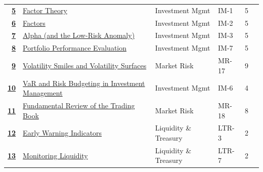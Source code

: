 \begin{longtable}{@{}r@{\hskip 7pt}L{6.35cm}@{\hskip 5pt}l@{\hskip 10pt}l@{\hskip 3pt}r@{\hskip 7pt}r@{}}
\hyperref[roi:5]{{\sffamily\bfseries\color{FRMGold}5}} & \hyperref[roi:5]{{\color{black}Factor Theory}} & {\color{FRMGrey}Investment Mgmt} & {\color{FRMGrey}IM-1} & {\color{FRMGrey}5} & \hyperref[roi:5]{{\sffamily\bfseries\color{FRMNavy}\pageref{roi:5}}} \\
\hyperref[roi:6]{{\sffamily\bfseries\color{FRMGold}6}} & \hyperref[roi:6]{{\color{black}Factors}} & {\color{FRMGrey}Investment Mgmt} & {\color{FRMGrey}IM-2} & {\color{FRMGrey}5} & \hyperref[roi:6]{{\sffamily\bfseries\color{FRMNavy}\pageref{roi:6}}} \\
\hyperref[roi:7]{{\sffamily\bfseries\color{FRMGold}7}} & \hyperref[roi:7]{{\color{black}Alpha (and the Low-Risk Anomaly)}} & {\color{FRMGrey}Investment Mgmt} & {\color{FRMGrey}IM-3} & {\color{FRMGrey}5} & \hyperref[roi:7]{{\sffamily\bfseries\color{FRMNavy}\pageref{roi:7}}} \\
\hyperref[roi:8]{{\sffamily\bfseries\color{FRMGold}8}} & \hyperref[roi:8]{{\color{black}Portfolio Performance Evaluation}} & {\color{FRMGrey}Investment Mgmt} & {\color{FRMGrey}IM-7} & {\color{FRMGrey}5} & \hyperref[roi:8]{{\sffamily\bfseries\color{FRMNavy}\pageref{roi:8}}} \\
\hyperref[roi:9]{{\sffamily\bfseries\color{FRMGold}9}} & \hyperref[roi:9]{{\color{black}Volatility Smiles and Volatility Surfaces}} & {\color{FRMGrey}Market Risk} & {\color{FRMGrey}MR-17} & {\color{FRMGrey}9} & \hyperref[roi:9]{{\sffamily\bfseries\color{FRMNavy}\pageref{roi:9}}} \\
\hyperref[roi:10]{{\sffamily\bfseries\color{FRMGold}10}} & \hyperref[roi:10]{{\color{black}VaR and Risk Budgeting in Investment Management}} & {\color{FRMGrey}Investment Mgmt} & {\color{FRMGrey}IM-6} & {\color{FRMGrey}4} & \hyperref[roi:10]{{\sffamily\bfseries\color{FRMNavy}\pageref{roi:10}}} \\
\hyperref[roi:11]{{\sffamily\bfseries\color{FRMGold}11}} & \hyperref[roi:11]{{\color{black}Fundamental Review of the Trading Book}} & {\color{FRMGrey}Market Risk} & {\color{FRMGrey}MR-18} & {\color{FRMGrey}8} & \hyperref[roi:11]{{\sffamily\bfseries\color{FRMNavy}\pageref{roi:11}}} \\
\hyperref[roi:12]{{\sffamily\bfseries\color{FRMGold}12}} & \hyperref[roi:12]{{\color{black}Early Warning Indicators}} & {\color{FRMGrey}Liquidity \& Treasury} & {\color{FRMGrey}LTR-3} & {\color{FRMGrey}2} & \hyperref[roi:12]{{\sffamily\bfseries\color{FRMNavy}\pageref{roi:12}}} \\
\hyperref[roi:13]{{\sffamily\bfseries\color{FRMGold}13}} & \hyperref[roi:13]{{\color{black}Monitoring Liquidity}} & {\color{FRMGrey}Liquidity \& Treasury} & {\color{FRMGrey}LTR-7} & {\color{FRMGrey}2} & \hyperref[roi:13]{{\sffamily\bfseries\color{FRMNavy}\pageref{roi:13}}} \\

\end{longtable}
